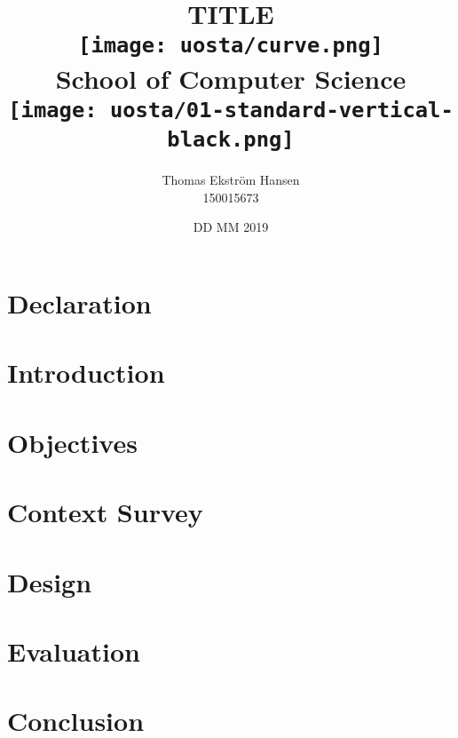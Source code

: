 \documentclass[12pt]{report}
\title{
    {TITLE}\\
    \vspace{2cm}
    {\texttt{[image: uosta/curve.png]}}\\
    {\fontfamily{ppl}\selectfont\large School of Computer Science}\\
    \vspace{-0.8cm}
    {\texttt{[image: uosta/01-standard-vertical-black.png]}}\\
    \vspace{-2cm}
}
\author{
    {Thomas Ekstr{\" o}m Hansen}\\
    {150015673}
}
\date{DD MM 2019}
\begin{document}
    \maketitle
    
    \tableofcontents
    
    \chapter*{Declaration}
    
    
    \chapter{Introduction}
    
    
    \chapter{Objectives}
    
    
    \chapter{Context Survey}
    
        
    \chapter{Design}
    
    
    \chapter{Evaluation}
    
        
    \chapter{Conclusion}
    
    
    
    
\end{document}
